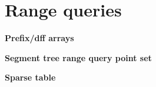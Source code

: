\section{Range queries}
    \textbf{Prefix/dff arrays}
    

    \textbf{Segment tree range query point set}
    

    \textbf{Sparse table}
    
